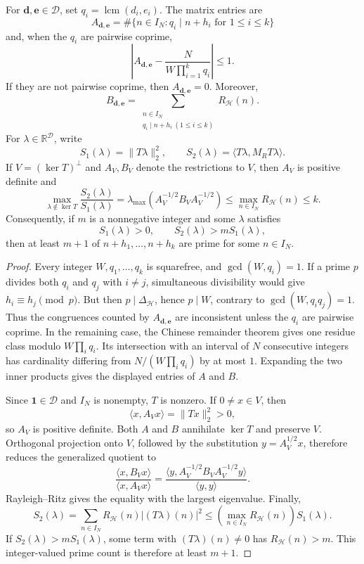 \documentclass[11pt]{article}
\begin{document}
\begin{proposition}\label{prop:finite}
For $\boldsymbol d,\boldsymbol e\in\mathcal D$, set
$q_i=\operatorname{lcm}(d_i,e_i)$.  The matrix entries are
\[
 A_{\boldsymbol d,\boldsymbol e}
 =\#\{n\in I_N:q_i\mid n+h_i\text{ for }1\leq i\leq k\}
\]
and, when the $q_i$ are pairwise coprime,
\[
 \left|A_{\boldsymbol d,\boldsymbol e}
       -\frac{N}{W\prod_{i=1}^kq_i}\right|\leq1.
\]
If they are not pairwise coprime, then
$A_{\boldsymbol d,\boldsymbol e}=0$.  Moreover,
\[
 B_{\boldsymbol d,\boldsymbol e}
 =\sum_{\substack{n\in I_N\\q_i\mid n+h_i\ (1\leq i\leq k)}}
 R_{\mathcal H}(n).
\]
For $\lambda\in\mathbb R^{\mathcal D}$, write
\[
 S_1(\lambda)=\|T\lambda\|_2^2,
 \qquad
 S_2(\lambda)=\langle T\lambda,M_RT\lambda\rangle.
\]
If $V=(\ker T)^\perp$ and $A_V,B_V$ denote the restrictions to $V$, then
$A_V$ is positive definite and
\[
 \max_{\lambda\notin\ker T}\frac{S_2(\lambda)}{S_1(\lambda)}
 =\lambda_{\max}\!\left(A_V^{-1/2}B_VA_V^{-1/2}\right)
 \leq \max_{n\in I_N}R_{\mathcal H}(n)\leq k.
\]
Consequently, if $m$ is a nonnegative integer and some $\lambda$ satisfies
\[
 S_1(\lambda)>0,
 \qquad S_2(\lambda)>mS_1(\lambda),
\]
then at least $m+1$ of $n+h_1,\ldots,n+h_k$ are prime for some $n\in I_N$.
\end{proposition}

\begin{proof}
Every integer $W,q_1,\ldots,q_k$ is squarefree, and $\gcd(W,q_i)=1$.
If a prime $p$ divides both $q_i$ and
$q_j$ with $i\ne j$, simultaneous divisibility would give
$h_i\equiv h_j\pmod p$.  But then $p\mid\Delta_{\mathcal H}$, hence $p\mid W$,
contrary to $\gcd(W,q_iq_j)=1$.  Thus the congruences counted by
$A_{\boldsymbol d,\boldsymbol e}$ are inconsistent unless the $q_i$ are
pairwise coprime.  In the remaining case, the Chinese remainder theorem gives
one residue class modulo $W\prod_iq_i$.  Its intersection with an interval of
$N$ consecutive integers has cardinality differing from
$N/(W\prod_iq_i)$ by at most $1$.  Expanding the two inner products gives the
displayed entries of $A$ and $B$.

Since $\boldsymbol 1\in\mathcal D$ and $I_N$ is nonempty, $T$ is nonzero.  If
$0\ne x\in V$, then
\[
 \langle x,A_Vx\rangle=\|Tx\|_2^2>0,
\]
so $A_V$ is positive definite.  Both $A$ and $B$ annihilate $\ker T$ and
preserve $V$.  Orthogonal projection onto $V$, followed by the substitution
$y=A_V^{1/2}x$, therefore reduces the generalized quotient to
\[
 \frac{\langle x,B_Vx\rangle}{\langle x,A_Vx\rangle}
 =\frac{\langle y,A_V^{-1/2}B_VA_V^{-1/2}y\rangle}
        {\langle y,y\rangle}.
\]
Rayleigh--Ritz gives the equality with the largest eigenvalue.  Finally,
\[
 S_2(\lambda)
 =\sum_{n\in I_N}R_{\mathcal H}(n)|(T\lambda)(n)|^2
 \leq\left(\max_{n\in I_N}R_{\mathcal H}(n)\right)S_1(\lambda).
\]
If $S_2(\lambda)>mS_1(\lambda)$, some term with
$(T\lambda)(n)\ne0$ has $R_{\mathcal H}(n)>m$.  This integer-valued prime
count is therefore at least $m+1$.
\end{proof}
\end{document}
